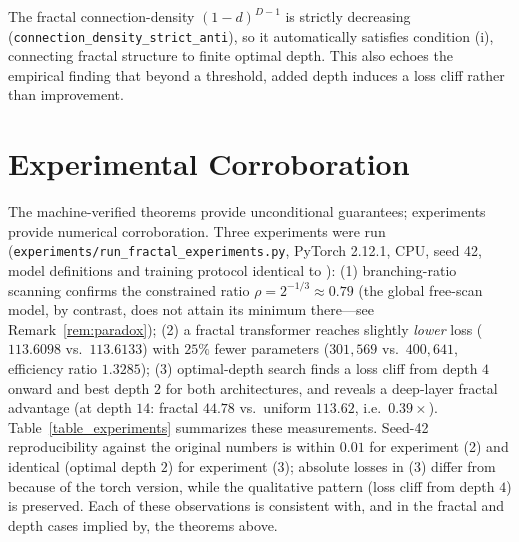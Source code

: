\documentclass[journal]{IEEEtran}
\begin{document}
The fractal connection-density $(1-d)^{D-1}$ is strictly decreasing
(\texttt{connection\_density\_strict\_anti}), so it automatically satisfies
condition (i), connecting fractal structure to finite optimal depth. This also
echoes the empirical finding that beyond a threshold, added depth induces a loss
cliff rather than improvement.

\section{Experimental Corroboration}
\label{sec:experiments}
The machine-verified theorems provide unconditional guarantees; experiments
provide numerical corroboration. Three experiments were run
(\texttt{experiments/run\_fractal\_experiments.py}, PyTorch 2.12.1, CPU,
seed 42, model definitions and training protocol identical to
\cite{shape2026}): (1) branching-ratio scanning confirms the constrained
ratio $\rho=2^{-1/3}\approx0.79$ (the global free-scan model, by contrast,
does not attain its minimum there---see Remark~\ref{rem:paradox}); (2) a
fractal transformer reaches slightly \emph{lower} loss ($113.6098$ vs.\
$113.6133$) with $25\%$ fewer parameters ($301{,}569$ vs.\ $400{,}641$,
efficiency ratio $1.3285$); (3) optimal-depth search finds a loss cliff from
depth $4$ onward and best depth $2$ for both architectures, and reveals a
deep-layer fractal advantage (at depth $14$: fractal $44.78$ vs.\ uniform
$113.62$, i.e.\ $0.39\times$). Table~\ref{table_experiments} summarizes these
measurements. Seed-42 reproducibility against the original numbers is within
$0.01$ for experiment (2) and identical (optimal depth $2$) for experiment
(3); absolute losses in (3) differ from \cite{shape2026} because of the
torch version, while the qualitative pattern (loss cliff from depth $4$)
is preserved. Each of these observations is consistent with, and in the
fractal and depth cases implied by, the theorems above.
\end{document}
